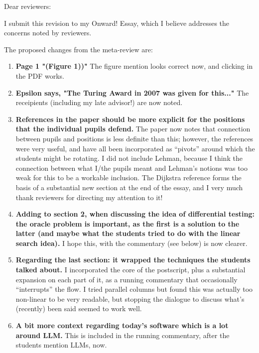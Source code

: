 \documentclass{letter}
\begin{document}
\begin{letter}{}
\opening{Dear reviewers:}

I submit this revision to my Onward! Essay, which I believe addresses the concerns noted by reviewers.

The proposed changes from the meta-review are:

\begin{enumerate}

\item {\bf Page 1 "(Figure 1))"} The figure mention looks correct now, and clicking in the PDF works.

\item {\bf Epsilon says, "The Turing Award in 2007 was given for this..."}  The receipients (including my late advisor!) are now noted.

\item {\bf  References in the paper should be more explicit for the positions that the individual pupils defend.}  The paper now notes that connection between pupils and positions is less definite than this; however, the references were very useful, and have all been incorporated as ``pivots'' around which the students might be rotating.  I did not include Lehman, because I think the connection between what I/the pupils meant and Lehman's notions was too weak for this to be a workable inclusion.  The Dijkstra reference forms the basis of a substantial new section at the end of the essay, and I very much thank reviewers for directing my attention to it!

\item {\bf Adding to section 2, when discussing the idea of differential testing: the oracle problem is important, as the first is a solution to the latter (and maybe what the students tried to do with the linear search idea).}  I hope this, with the commentary (see below) is now clearer.

\item {\bf Regarding the last section: it wrapped the techniques the students talked about.}  I incorporated the core of the postscript, plus a substantial expansion on each part of it, as a running commentary that occasionally ``interrupts'' the flow.  I tried parallel columns but found this was actually too non-linear to be very readable, but stopping the dialogue to discuss what's (recently) been said seemed to work well.

\item {\bf A bit more context regarding today's software which is a lot around LLM.}  This is included in the running commentary, after the students mention LLMs, now.


\end{enumerate}
\end{letter}
\end{document}
